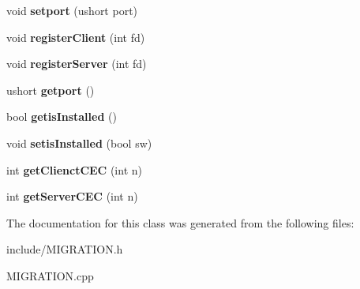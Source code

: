 \begin{DoxyCompactItemize}
\item 
\hypertarget{classMIGRATION_a3a489b688757ce0bc03a838cc63656bf}{}void {\bfseries setport} (ushort port)\label{classMIGRATION_a3a489b688757ce0bc03a838cc63656bf}

\item 
\hypertarget{classMIGRATION_a3785c32dec8ded19719f3cc9f6ab91a0}{}void {\bfseries register\+Client} (int fd)\label{classMIGRATION_a3785c32dec8ded19719f3cc9f6ab91a0}

\item 
\hypertarget{classMIGRATION_a26c622c381c8aa0e65fe5d0a1efe2a7f}{}void {\bfseries register\+Server} (int fd)\label{classMIGRATION_a26c622c381c8aa0e65fe5d0a1efe2a7f}

\item 
\hypertarget{classMIGRATION_a3936956ccc2eb23b8ae8b76a0c379d6f}{}ushort {\bfseries getport} ()\label{classMIGRATION_a3936956ccc2eb23b8ae8b76a0c379d6f}

\item 
\hypertarget{classMIGRATION_ade09b9a70f9c38106bb524e1d2190313}{}bool {\bfseries getis\+Installed} ()\label{classMIGRATION_ade09b9a70f9c38106bb524e1d2190313}

\item 
\hypertarget{classMIGRATION_a78e931d01f12c152c963ff01a95bc1a2}{}void {\bfseries setis\+Installed} (bool sw)\label{classMIGRATION_a78e931d01f12c152c963ff01a95bc1a2}

\item 
\hypertarget{classMIGRATION_a6ab6735bee3820f4f9b7109948e776ae}{}int {\bfseries get\+Clienct\+C\+E\+C} (int n)\label{classMIGRATION_a6ab6735bee3820f4f9b7109948e776ae}

\item 
\hypertarget{classMIGRATION_a1ca05f1ed042a5bd72c7f1c9f2eacfba}{}int {\bfseries get\+Server\+C\+E\+C} (int n)\label{classMIGRATION_a1ca05f1ed042a5bd72c7f1c9f2eacfba}

\end{DoxyCompactItemize}


The documentation for this class was generated from the following files\+:\begin{DoxyCompactItemize}
\item 
include/M\+I\+G\+R\+A\+T\+I\+O\+N.\+h\item 
M\+I\+G\+R\+A\+T\+I\+O\+N.\+cpp\end{DoxyCompactItemize}
